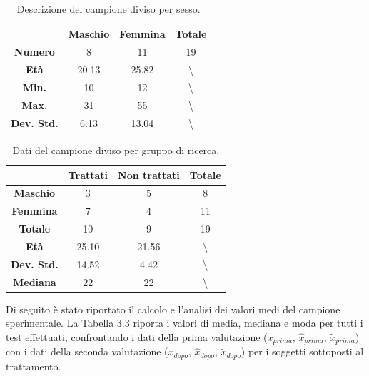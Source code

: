 \begin{table}[H]
\begin{center}
\begin{tabular}{|c|c|c|c|} \hline
{\textbf{}} & {\textbf{Maschio}} & {\textbf{Femmina}}& {\textbf{Totale}}\\ \hline
\textbf{Numero} & 8 & 11 & 19 \\ 
\textbf{Età} & 20.13 & 25.82 & \textbackslash \\ 
\textbf{Min.} & 10 & 12 & \textbackslash \\ 
\textbf{Max.} & 31 & 55 & \textbackslash \\ 
\textbf{Dev. Std.} & 6.13 & 13.04 & \textbackslash \\
\hline
\end{tabular}
\end{center}
\caption{Descrizione del campione diviso per sesso.}
\end{table}
\begin{table}[H]
\begin{center}
\begin{tabular}{|c|c|c|c|} \hline
{\textbf{}} & {\textbf{Trattati}} & {\textbf{Non trattati}}& {\textbf{Totale}}\\ \hline
\textbf{Maschio} & 3 & 5 & 8 \\
\textbf{Femmina} & 7 & 4 & 11\\ 
\textbf{Totale} & 10 & 9 & 19 \\ 
\textbf{Età} & 25.10 & 21.56 & \textbackslash \\ 
\textbf{Dev. Std.} & 14.52 & 4.42 & \textbackslash \\
\textbf{Mediana} & 22 & 22 & \textbackslash \\
\hline
\end{tabular}
\end{center}
\caption{Dati del campione diviso per gruppo di ricerca.}
\end{table}

Di seguito è stato riportato il calcolo e l’analisi dei valori medi del campione sperimentale.
La Tabella 3.3 riporta i valori di media, mediana e moda per tutti i test effettuati, confrontando i dati della prima valutazione ($\bar{x}_{prima}$, $\hat{x}_{prima}$, $\tilde{x}_{prima}$) con i dati della seconda valutazione ($\bar{x}_{dopo}$, $\hat{x}_{dopo}$, $\tilde{x}_{dopo}$) per i soggetti sottoposti al trattamento.

